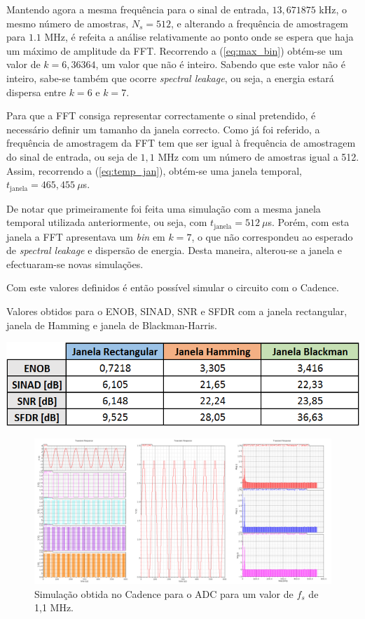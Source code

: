 \documentclass[11pt]{article}
\numberwithin{equation}{section}
\begin{document}
Mantendo agora a mesma frequência para o sinal de entrada, $13,671875$ kHz, o mesmo número de amostras, $N_{s} = 512$, e alterando a frequência de amostragem para $1.1$ MHz, é refeita a análise relativamente ao ponto onde se espera que haja um máximo de amplitude da FFT. Recorrendo a (\ref{eq:max_bin}) obtém-se um valor de $k = 6,36364$, um valor que não é inteiro. Sabendo que este valor não é inteiro, sabe-se também que ocorre \textit{spectral leakage}, ou seja, a energia estará dispersa entre $k = 6$ e $k = 7$.

Para que a FFT consiga representar correctamente o sinal pretendido, é necessário definir um tamanho da janela correcto. Como já foi referido, a frequência de amostragem da FFT tem que ser igual à frequência de amostragem do sinal de entrada, ou seja de $1,1$ MHz com um número de amostras igual a 512. Assim, recorrendo a (\ref{eq:temp_jan}), obtém-se uma janela temporal, $t_{\text{janela}} = 465,455~\mu$s.

De notar que primeiramente foi feita uma simulação com a mesma janela temporal utilizada anteriormente, ou seja, com $t_{\text{janela}} = 512~\mu$s. Porém, com esta janela a FFT apresentava um \textit{bin} em $k = 7$, o que não correspondeu ao esperado de \textit{spectral leakage} e dispersão de energia. Desta maneira, alterou-se a janela e efectuaram-se novas simulações.

Com este valores definidos é então possível simular o circuito com o Cadence.

\begin{table}[H]
	\centering
	\caption{Valores obtidos para o ENOB, SINAD, SNR e SFDR com a janela rectangular, janela de Hamming e janela de Blackman-Harris.}
 	\includegraphics[keepaspectratio=true, scale=0.50]{lab/janelas.png}
\end{table}

\begin{figure}[H]
	\centering
	\includegraphics[keepaspectratio=true, scale=0.27]{lab/f_11M.png}
	\caption{Simulação obtida no Cadence para o ADC para um valor de $f_{s}$ de 1,1 MHz.}
	\vspace{-0.8em}
\end{figure}
\end{document}
